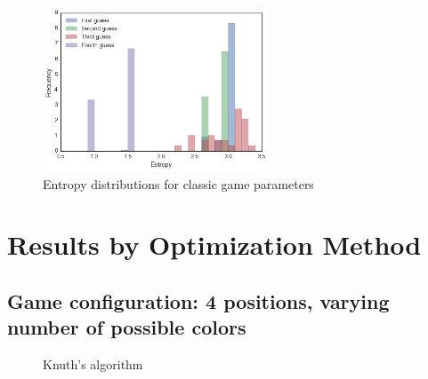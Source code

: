 \documentclass[11pt]{article}
\begin{document}
\begin{figure}[!htbp]
\centering
\includegraphics[width=0.6\textwidth]{img/entropy}
\caption{Entropy distributions for classic game parameters}
\label{fig:entropy}
\end{figure}

\newpage
\section{Results by Optimization Method}

\subsection*{Game configuration: 4 positions, varying number of possible colors}

\begin{figure}[h!]
\centering
{}
\caption{Knuth's algorithm}
\label{fig:knuth}
\end{figure}
\end{document}
